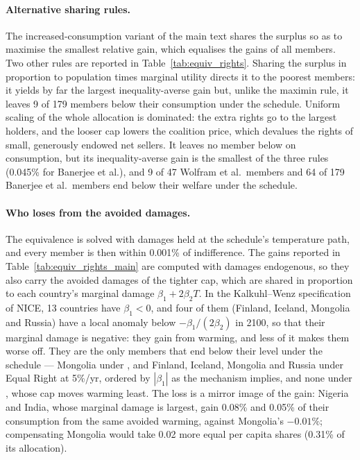 \documentclass[12pt,english]{article}
\newif\ifblind
\theoremstyle{remark}
\begin{document}
\paragraph{Alternative sharing rules.} The increased-consumption variant of the main text shares the surplus so as to maximise the smallest relative gain, which equalises the gains of all members. Two other rules are reported in Table~\ref{tab:equiv_rights}. Sharing the surplus in proportion to population times marginal utility directs it to the poorest members: it yields by far the largest inequality-averse gain 
but, unlike the maximin rule, it leaves 9 of 179 members below their consumption under the schedule. Uniform scaling of the whole allocation is dominated: the extra rights go to the largest holders, and the looser cap lowers the coalition price, which devalues the rights of small, generously endowed net sellers. It leaves no member below on consumption, but its inequality-averse gain is the smallest of the three rules (0.045\% for Banerjee et al.), and 9 of 47 Wolfram et al.\ members and 64 of 179 Banerjee et al.\ members end below their welfare under the schedule.




\paragraph{Who loses from the avoided damages.} The equivalence is solved with damages held at the schedule's temperature path, and every member is then within 0.001\% of indifference. The gains reported in Table~\ref{tab:equiv_rights_main} are computed with damages endogenous, so they also carry the avoided damages of the tighter cap, which are shared in proportion to each country's marginal damage $\beta_1+2\beta_2 T$. In the Kalkuhl--Wenz specification of NICE, 13 countries have $\beta_1<0$, and four of them (Finland, Iceland, Mongolia and Russia) have a local anomaly below $-\beta_1/(2\beta_2)$ in 2100, so that their marginal damage is negative: they gain from warming, and less of it makes them worse off. They are the only members that end below their level under the schedule --- Mongolia under \citet{banerjee_grand_2025}, and Finland, Iceland, Mongolia and Russia under Equal Right at 5\%/yr, ordered by $|\beta_1|$ as the mechanism implies, and none under \citet{wolfram_building_2025}, whose cap moves warming least. The loss is a mirror image of the gain: Nigeria and India, whose marginal damage is largest, gain 0.08\% and 0.05\% of their consumption from the same avoided warming, against Mongolia's $-0.01\%$; compensating Mongolia would take 0.02 more equal per capita shares (0.31\% of its allocation). %
\end{document}
